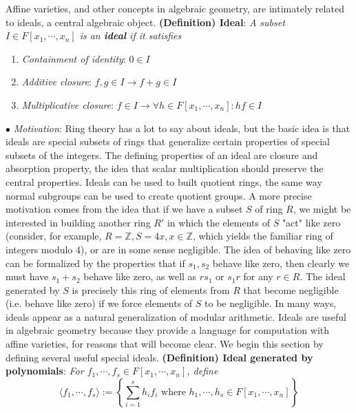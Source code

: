 \documentclass{article}
\begin{document}
Affine varieties, and other concepts in algebraic geometry, are intimately related to ideals, a central algebraic object.
\newline \newline
\textbf{(Definition) Ideal}: \textit{A subset $ I \in F[x_1, \cdots, x_n] $ is an \textbf{ideal} if it satisfies}
\begin{enumerate}
	\item \textit{Containment of identity}: $ 0 \in I $
	\item \textit{Additive closure}: $ f, g \in I \rightarrow f + g \in I $
	\item \textit{Multiplicative closure}: $ f \in I \rightarrow \forall h \in F[x_1, \cdots, x_n]: hf \in I $
\end{enumerate}
\indent $ \bullet $ \textit{Motivation}: Ring theory has a lot to say about ideals, but the basic idea is that ideals are special subsets of rings that generalize certain properties of special subsets of the integers. The defining properties of an ideal are closure and absorption property, the idea that scalar multiplication should preserve the central properties. Ideals can be used to built quotient rings, the same way normal subgroups can be used to create quotient groups. A more precise motivation comes from the idea that if we have a subset $ S $ of ring $ R $, we might be interested in building another ring $ R' $ in which the elements of $ S $ "act" like zero (consider, for example, $ R = \mathbb{Z}, S = {4 x, x \in \mathbb{Z}} $, which yields the familiar ring of integers modulo 4), or are in some sense negligible. The idea of behaving like zero can be formalized by the properties that if $ s_1, s_2 $ behave like zero, then clearly we must have $ s_1 + s_2 $ behave like zero, as well as $ r s_1 $ or $ s_1 r $ for any $ r \in R $. The ideal generated by $ S $ is precisely this ring of elements from $ R $ that become negligible (i.e. behave like zero) if we force elements of $ S $ to be negligible. In many ways, ideals appear as a natural generalization of modular arithmetic.
\newline
Ideals are useful in algebraic geometry because they provide a language for computation with affine varieties, for reasons that will become clear. We begin this section by defining several useful special ideals.
\newline \newline
\textbf{(Definition) Ideal generated by polynomials}: \textit{For $ f_1, \cdots, f_s \in F[x_1, \cdots, x_n] $, define}
$$ \langle f_1, \cdots, f_s \rangle := \left\{ \sum_{i = 1}^s h_i f_i \text{ where } h_1, \cdots, h_s \in F[x_1, \cdots, x_n] \right\} $$
\end{document}
